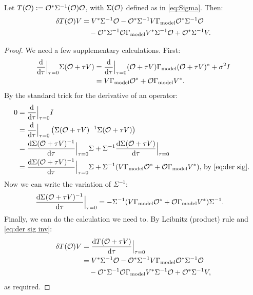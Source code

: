 \documentclass{amsart}
\numberwithin{equation}{section}
\begin{document}
\begin{lemma}\label{lemma:aux calc}
  Let $T(\mathcal{O}) := \mathcal{O}^* \Sigma^{-1}(\mathcal{O})\mathcal{O}$, with $\Sigma(\mathcal{O})$
  defined as in \eqref{eq:Sigma}. Then:
  \begin{align*}
    \delta T(\mathcal{O})V &= V^* \Sigma^{-1} \mathcal{O} 
    - \mathcal{O}^*\Sigma^{-1} V\Gamma_{\textup{model}} \mathcal{O}^* \Sigma^{-1}\mathcal{O} \\
    &\ \ \ - \mathcal{O}^* \Sigma^{-1} \mathcal{O} \Gamma_{\textup{model}} V^* \Sigma^{-1}\mathcal{O}
    + \mathcal{O}^* \Sigma^{-1} V.
  \end{align*}
\end{lemma}

\begin{proof}
  We need a few supplementary calculations. First:
  \begin{align}\label{eq:der sig}
    \begin{split}
      \frac{\text{\textup{d}}}{\text{\textup{d}} \tau} \Big |_{\tau=0} \Sigma( \mathcal{O} + \tau V )
      &= \frac{\text{\textup{d}}}{\text{\textup{d}} \tau} \Big |_{\tau=0} 
      (\mathcal{O} + \tau V ) \Gamma_{\textup{model}} (\mathcal{O} + \tau V )^*  + \sigma^2I\\
      &= V \Gamma_{\textup{model}} \mathcal{O}^* + \mathcal{O} \Gamma_{\textup{model}} V^*.
    \end{split}
  \end{align}
  By the standard trick for the derivative of an operator: 
  \begin{align*}
    0 &= \frac{\text{\textup{d}}}{\text{\textup{d}} \tau} \Big |_{\tau=0} I \\
    &= \frac{\text{\textup{d}}}{\text{\textup{d}} \tau} \Big |_{\tau=0}
    \left (\Sigma(\mathcal{O}+\tau V)^{-1} \Sigma(\mathcal{O}+\tau V) \right ) \\
    &= \frac{\text{\textup{d}} \Sigma(\mathcal{O}+\tau V)^{-1}}{\text{\textup{d}} \tau} \Big |_{\tau=0} \Sigma+
    \Sigma^{-1} \frac{\text{\textup{d}} \Sigma(\mathcal{O}+\tau V)}{\text{\textup{d}} \tau} \Big |_{\tau=0}\\  
    &= \frac{\text{\textup{d}} \Sigma(\mathcal{O}+\tau V)^{-1}}{\text{\textup{d}} \tau} \Big |_{\tau=0} \Sigma+
    \Sigma^{-1} (V\Gamma_{\textup{model}} \mathcal{O}^* + \mathcal{O} \Gamma_{\textup{model}} V^*) 
    \text{, by \eqref{eq:der sig}. }
  \end{align*}
  Now we can write the variation of $\Sigma^{-1}$:
  \begin{align}\label{eq:der sig inv}
    \frac{\text{\textup{d}} \Sigma(\mathcal{O}+\tau V)^{-1}}{\text{\textup{d}} \tau} \Big |_{\tau=0}  
      &= -\Sigma^{-1} (V \Gamma_{\textup{model}} \mathcal{O}^* + \mathcal{O} \Gamma_{\textup{model}} V^*) \Sigma^{-1}.
    \end{align}
  Finally, we can do the calculation we need to. By Leibnitz (product) rule
  and \eqref{eq:der sig inv}:
  \begin{align*}
    \delta T(\mathcal{O}) V 
    &= \frac{\text{\textup{d}} T(\mathcal{O} + \tau V)}{\text{\textup{d}} \tau} \Big |_{\tau=0} \\
    &= V^* \Sigma^{-1} \mathcal{O} 
    - \mathcal{O}^*\Sigma^{-1} V\Gamma_{\textup{model}} \mathcal{O}^* \Sigma^{-1}\mathcal{O} \\
    &\ \ \ - \mathcal{O}^* \Sigma^{-1} \mathcal{O} \Gamma_{\textup{model}} V^* \Sigma^{-1}\mathcal{O}
    + \mathcal{O}^* \Sigma^{-1} V,
  \end{align*}
  as required.
\end{proof}
\end{document}
